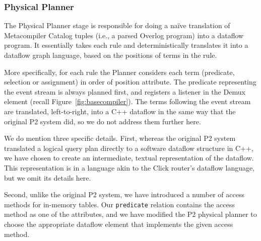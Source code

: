 \documentclass{sigmod08}
\newcommand{\ol}[1]{\texttt{\small #1}\xspace}
\begin{document}
\subsubsection{Physical Planner}
\label{sec:planner}

The Physical Planner stage is responsible for doing a na\"{i}ve
translation of Metacompiler Catalog tuples (i.e., a parsed Overlog program) into a dataflow program. It essentially takes each rule and deterministically translates it into a dataflow graph language, based on the positions of terms in the rule.

More specifically, for each rule the Planner considers each term
(predicate, selection or assignment) in order of position attribute.
The predicate representing the event stream is always planned first,
and registers a listener in the Demux element (recall
Figure~\ref{fig:basecompiler}).  The terms following the event stream
are translated, left-to-right, into a C++ dataflow in the same way that
the original P2 system did, so we do not address them further here.

We do mention three specific details. First, whereas the original P2
system translated a logical query plan directly to a software dataflow
structure in C++, we have chosen to create an intermediate, textual
representation of the dataflow. This representation is in a language
akin to the Click router's dataflow language, but we omit its details here. 

Second, unlike the original P2
system, we have introduced a number of access methods for in-memory
tables. Our \ol{predicate} relation contains the access method as one of
the attributes, and we have modified the P2 physical planner to choose
the appropriate dataflow element that implements the given access
method. 

\end{document}
